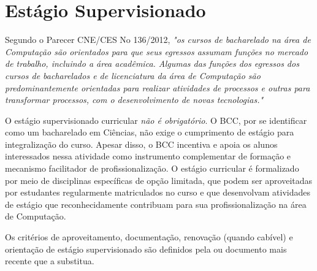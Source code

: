 \section{Estágio Supervisionado}
\label{sec:estagio}

Segundo o Parecer CNE/CES No 136/2012, \textit{"os cursos de bacharelado na área de Computação são orientados para que seus egressos assumam funções no mercado de trabalho, incluindo a área acadêmica. Algumas das funções dos egressos dos cursos de bacharelados e de licenciatura da área de Computação são predominantemente orientadas para realizar atividades de processos e outras para transformar processos, com o desenvolvimento de novas tecnologias."}

O estágio supervisionado curricular \textit{não é obrigatório}. O BCC, por se identificar como um bacharelado em Ciências, não exige o cumprimento de estágio para integralização do curso. Apesar disso, o BCC incentiva e apoia os alunos interessados nessa atividade como instrumento complementar de formação e mecanismo facilitador de profissionalização. O estágio curricular é formalizado por meio de disciplinas específicas de opção limitada, que podem ser aproveitadas por estudantes regularmente matriculados no curso e que desenvolvam atividades de estágio que reconhecidamente contribuam para sua profissionalização na área de Computação.

Os critérios de aproveitamento, documentação, renovação (quando cabível) e orientação de estágio supervisionado são definidos pela  ou documento mais recente que a substitua.


